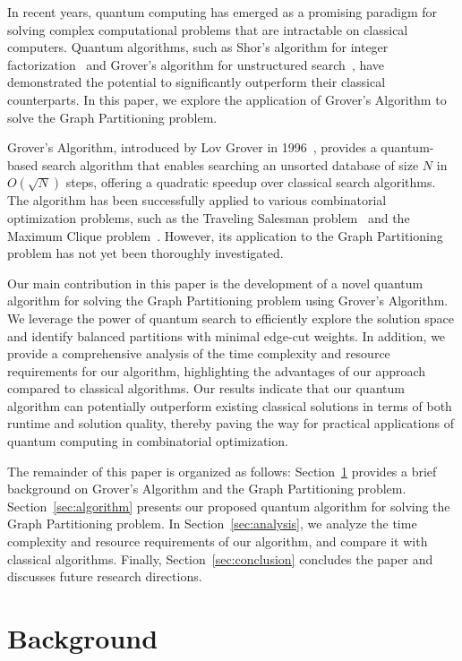 In recent years, quantum computing has emerged as a promising paradigm for solving complex computational problems that are intractable on classical computers. Quantum algorithms, such as Shor's algorithm for integer factorization~\cite{shor} and Grover's algorithm for unstructured search~\cite{grover}, have demonstrated the potential to significantly outperform their classical counterparts. In this paper, we explore the application of Grover's Algorithm to solve the Graph Partitioning problem.

Grover's Algorithm, introduced by Lov Grover in 1996~\cite{grover}, provides a quantum-based search algorithm that enables searching an unsorted database of size $N$ in $O(\sqrt{N})$ steps, offering a quadratic speedup over classical search algorithms. The algorithm has been successfully applied to various combinatorial optimization problems, such as the Traveling Salesman problem~\cite{travelling_salesman} and the Maximum Clique problem~\cite{maximum_clique}. However, its application to the Graph Partitioning problem has not yet been thoroughly investigated.

Our main contribution in this paper is the development of a novel quantum algorithm for solving the Graph Partitioning problem using Grover's Algorithm. We leverage the power of quantum search to efficiently explore the solution space and identify balanced partitions with minimal edge-cut weights. In addition, we provide a comprehensive analysis of the time complexity and resource requirements for our algorithm, highlighting the advantages of our approach compared to classical algorithms. Our results indicate that our quantum algorithm can potentially outperform existing classical solutions in terms of both runtime and solution quality, thereby paving the way for practical applications of quantum computing in combinatorial optimization.

The remainder of this paper is organized as follows: Section~\ref{sec:background} provides a brief background on Grover's Algorithm and the Graph Partitioning problem. Section~\ref{sec:algorithm} presents our proposed quantum algorithm for solving the Graph Partitioning problem. In Section~\ref{sec:analysis}, we analyze the time complexity and resource requirements of our algorithm, and compare it with classical algorithms. Finally, Section~\ref{sec:conclusion} concludes the paper and discusses future research directions.

\section{Background}
\label{sec:background}

